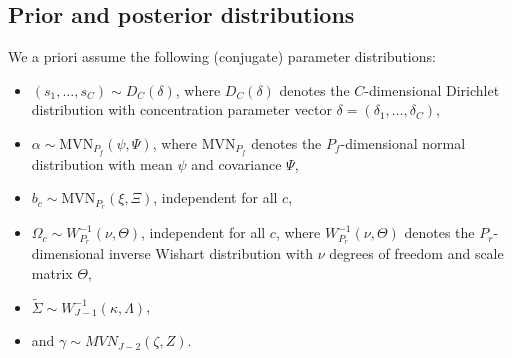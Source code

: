 \documentclass[article,shortnames]{jss}
\begin{document}
\subsection{Prior and posterior distributions} \label{subsec:prior_and_posterior}

We a priori assume the following (conjugate) parameter distributions:
\begin{itemize}
  \item $(s_1,\dots,s_C)\sim D_C(\delta)$, where $D_C(\delta)$ denotes the $C$-dimensional Dirichlet distribution with concentration parameter vector $\delta = (\delta_1,\dots,\delta_C)$,
  \item $\alpha\sim \text{MVN}_{P_f}(\psi,\Psi)$, where $\text{MVN}_{P_f}$ denotes the $P_f$-dimensional normal distribution with mean $\psi$ and covariance $\Psi$,
  \item $b_c \sim \text{MVN}_{P_r}(\xi,\Xi)$, independent for all $c$,
  \item $\Omega_c \sim W^{-1}_{P_r}(\nu,\Theta)$, independent for all $c$, where $W^{-1}_{P_r}(\nu,\Theta)$ denotes the $P_r$-dimensional inverse Wishart distribution with $\nu$ degrees of freedom and scale matrix $\Theta$,
  \item $\tilde{\Sigma} \sim W^{-1}_{J-1}(\kappa,\Lambda)$,
  \item and $\gamma \sim MVN_{J-2}(\zeta,Z)$.
\end{itemize}
\end{document}
